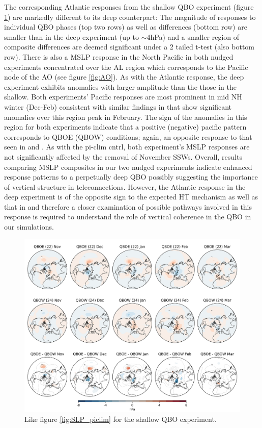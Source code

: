 The corresponding Atlantic responses from the shallow QBO experiment (figure \ref{fig:SLP_shallow}) are markedly different to its deep counterpart: The magnitude of responses to individual QBO phases (top two rows) as well as differences (bottom row) are smaller than in the deep experiment (up to $\sim$4hPa) and a smaller region of composite differences are deemed significant under a 2 tailed t-test (also bottom row). There is also a MSLP response in the North Pacific in both nudged experiments concentrated over the AL region which corresponds to the Pacific node of the AO (see figure \ref{fig:AO}). As with the Atlantic response, the deep experiment exhibits anomalies with larger amplitude than the those in the shallow. Both experiments' Pacific responses are most prominent in mid NH winter (Dec-Feb) consistent with similar findings in \cite{graySurface2018b} that show significant anomalies over this region peak in February. The sign of the anomalies in this region for both experiments indicate that a positive (negative) pacific pattern corresponds to QBOE (QBOW) conditions; again, an opposite response to that seen in \cite{andrewsObserved2019d} and \cite{graySurface2018b}. As with the pi-clim cntrl, both experiment's MSLP responses are not significantly affected by the removal of November SSWs. Overall, results comparing MSLP composites in our two nudged experiments indicate enhanced response patterns to a perpetually deep QBO possibly suggesting the importance of vertical structure in teleconnections. However, the Atlantic response in the deep experiment is of the opposite sign to the expected HT mechanism as well as that in \citep{andrewsObserved2019d} and therefore a closer examination of possible pathways involved in this response is required to understand the role of vertical coherence in the QBO in our simulations.

\begin{figure}[h!]
\begin{center}
\noindent\includegraphics[width =0.8\linewidth]{Figures/Figures-deepQBO/LAGGED_SLP_composites_individual_months_QBO_phases_U_s_50hPa_5thresh.png}
\caption[MSLP composites under different QBO phases in the shallow QBO simulation]{Like figure \ref{fig:SLP_piclim} for the shallow QBO experiment.}
\label{fig:SLP_shallow}
\end{center}
\end{figure}
\newpage


